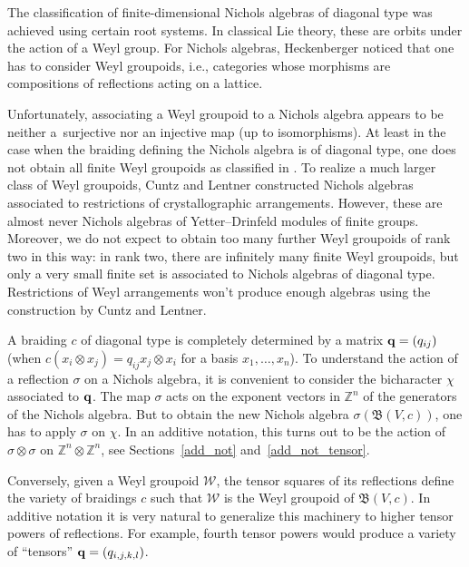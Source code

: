 \documentclass[pdftex]{sigma}
\numberwithin{equation}{section}
\newcommand{\ZZ }{\mathbb{Z}}
\newcommand{\Wg }{\mathcal{W}}
\newcommand{\qq }{{\bf q}}
\newcommand{\BB }{\mathfrak{B}}
\begin{document}
The classification of finite-dimensional Nichols algebras of diagonal type \cite{p-H-09} was achieved using certain root systems. In classical Lie theory, these are orbits under the action of a Weyl group. For Nichols algebras, Heckenberger \cite{p-H-06} noticed that one has to consider Weyl groupoids, i.e., categories whose morphisms are compositions of reflections acting on a lattice.

Unfortunately, associating a Weyl groupoid to a Nichols algebra appears to be neither a~surjective nor an injective map (up to isomorphisms). At least in the case when the braiding defining the Nichols algebra is of diagonal type, one does not obtain all finite Weyl groupoids as classified in \cite{p-CH10}. To realize a much larger class of Weyl groupoids, Cuntz and Lentner \cite{p-CL-17} constructed Nichols algebras associated to restrictions of crystallographic arrangements. However, these are almost never Nichols algebras of Yetter--Drinfeld modules of finite groups. Moreover, we do not expect to obtain too many further Weyl groupoids of rank two in this way: in rank two, there are infinitely many finite Weyl groupoids, but only a very small finite set is associated to Nichols algebras of diagonal type. Restrictions of Weyl arrangements won't produce enough algebras using the construction by Cuntz and Lentner.

A braiding $c$ of diagonal type is completely determined by a matrix $\qq=(q_{ij})$ (when $c(x_i\otimes x_j) = q_{ij} x_j\otimes x_i$ for a basis $x_1,\dots,x_n$). To understand the action of a reflection $\sigma$ on a Nichols algebra, it is convenient to consider the bicharacter $\chi$ associated to $\qq$. The map $\sigma$ acts on the exponent vectors in $\ZZ^n$ of the generators of the Nichols algebra. But to obtain the new Nichols algebra $\sigma(\BB(V,c))$, one has to apply $\sigma$ on $\chi$. In an additive notation, this turns out to be the action of $\sigma\otimes\sigma$ on $\ZZ^n\otimes \ZZ^n$, see Sections~\ref{add_not} and~\ref{add_not_tensor}.

Conversely, given a Weyl groupoid $\Wg$, the tensor squares of its reflections define the variety of braidings $c$ such that $\Wg$ is the Weyl groupoid of $\BB(V,c)$. In additive notation it is very natural to generalize this machinery to higher tensor powers of reflections.
For example, fourth tensor powers would produce a variety of ``tensors'' $\qq=(q_{i,j,k,l})$.
\end{document}
